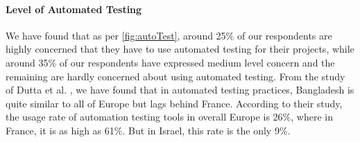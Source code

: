 \paragraph{Level of Automated Testing}
We have found that as per \ref{fig:autoTest}, around 25\% of our respondents are highly concerned that they have to use automated testing for their projects,   while around 35\% of our respondents have expressed medium level concern and the remaining are hardly concerned about using automated testing. From the study of Dutta et al. \cite{dutta1999}, we have found that in automated testing practices, Bangladesh is quite similar to all of Europe but lags behind France. According to their study, the usage rate of automation testing tools in overall Europe is 26\%, where in France, it is as high as 61\%. But in Israel, this rate is the only 9\%.
